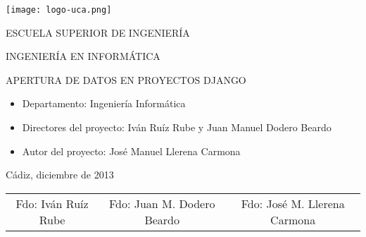 


\begin{center}

  \texttt{[image: logo-uca.png]} \\

  \vspace{2.5cm}

  \Large{ESCUELA SUPERIOR DE INGENIERÍA} \\

  \vspace{1.0cm}

  \large{INGENIERÍA EN INFORMÁTICA} \\

  \vspace{2.0cm}

  \large{APERTURA DE DATOS EN PROYECTOS DJANGO} \\

  \vspace{2.5cm}

\end{center}

\begin{itemize}
\item \large{Departamento: Ingeniería Informática}
\item \large{Directores del proyecto: Iván Ruíz Rube y Juan Manuel Dodero Beardo}
\item \large{Autor del proyecto: José Manuel Llerena Carmona}
\end{itemize}

\vspace{0.2cm}

\begin{flushright}
  \large{Cádiz, diciembre de 2013} \\

  \vspace{2.5cm}
  \begin{tabular}{ccc}
  \large{Fdo: Iván Ruíz Rube} & \large{Fdo: Juan M. Dodero Beardo} & \large{Fdo: José M. Llerena Carmona}\\
  \end{tabular}
\end{flushright}
